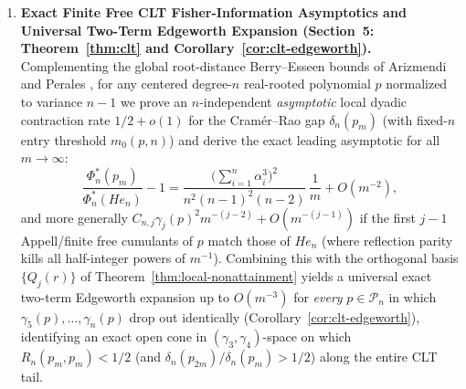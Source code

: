 \documentclass[11pt,a4paper]{article}
\theoremstyle{definition}
\begin{document}
\begin{enumerate}
Globally, an exact cubic discriminant identity strengthens the $n=3$ bound of \cite[\S 8]{HH2026} to the unnormalized additive inequality $\Delta_3(\alpha,\beta) \ge 2t(1-t)(\delta_3(\alpha)+\delta_3(\beta))$. For $n \ge 4$, colliding roots force the unnormalized additive constant to vanish (Proposition~\ref{prop:global-obstruction}), while an explicit Dyson-flow slope computation proves the upper bound $c_n^{(101)} \le 2/n + O(n^{-2})$ for \cite[eq.~(101)]{HH2026} (Proposition~\ref{prop:dyson-relative-obstruction}, complemented in Remark~\ref{rem:global-sharpness} by the exact rational quartic bound $c_4^{(101)} \le 876/1855 \approx 0.4722$ via the finite-free de Bruijn identity). Analyzing the $t \to 0^+$ Dyson limit of the Jacobian contraction operator directly identifies the elementary positive semidefinite divided-difference defect $K(\beta) := L(\beta) - \frac{4}{n(n-1)} s(\beta) s(\beta)^T \succeq 0$ as the first-order contraction generator and proves the exact error-term-free global upper bound $c_n^{(100)} \le \frac{1}{n-1}$ for every $n \ge 3$ on \cite[Conjecture~8.1 / eq.~(100)]{HH2026} (Theorem~\ref{thm:matrix-stam-eq100}), sharpened via rigorous interval arithmetic to $c_4^{(100)} \le 0.31413321 < \frac{1}{3}$ (Remark~\ref{rem:global-sharpness}(iv) and Appendix~\ref{app:certificates}). Note that these results constrain the decay rate of any degree-dependent constant $c_n > 0$ in \cite[Conjecture~8.1]{HH2026} without disproving the existence of a smaller positive $c_n$; moreover, while our proved upper bounds for eqs.~(100) and~(101) differ asymptotically by a factor of $2$, whether the \emph{optimal} global constants themselves separate remains open.

\item \textbf{Exact Finite Free CLT Fisher-Information Asymptotics and Universal Two-Term Edgeworth Expansion (Section~5: Theorem~\ref{thm:clt} and Corollary~\ref{cor:clt-edgeworth}).}
Complementing the global root-distance Berry--Esseen bounds of Arizmendi and Perales \cite{AP2020}, for any centered degree-$n$ real-rooted polynomial $p$ normalized to variance $n-1$ we prove an $n$-independent \emph{asymptotic} local dyadic contraction rate $1/2 + o(1)$ for the Cram\'er--Rao gap $\delta_n(p_m)$ (with fixed-$n$ entry threshold $m_0(p,n)$) and derive the exact leading asymptotic for all $m \to \infty$:
\[
\frac{\Phi_n^*(p_m)}{\Phi_n^*(He_n)} - 1 = \frac{\big(\sum_{i=1}^n \alpha_i^3\big)^2}{n^2 (n-1)^2 (n-2)}\,\frac{1}{m} + O(m^{-2}),
\]
and more generally $C_{n,j}\gamma_j(p)^2 m^{-(j-2)} + O(m^{-(j-1)})$ if the first $j-1$ Appell/finite free cumulants of $p$ match those of $He_n$ (where reflection parity kills all half-integer powers of $m^{-1}$). Combining this with the orthogonal basis $\{Q_j(r)\}$ of Theorem~\ref{thm:local-nonattainment} yields a universal exact two-term Edgeworth expansion up to $O(m^{-3})$ for \emph{every} $p \in \mathcal{P}_n$ in which $\gamma_5(p), \dots, \gamma_n(p)$ drop out identically (Corollary~\ref{cor:clt-edgeworth}), identifying an exact open cone in $(\gamma_3, \gamma_4)$-space on which $R_n(p_m, p_m) < 1/2$ (and $\delta_n(p_{2m})/\delta_n(p_m) > 1/2$) along the entire CLT tail.


\end{enumerate}
\end{document}
